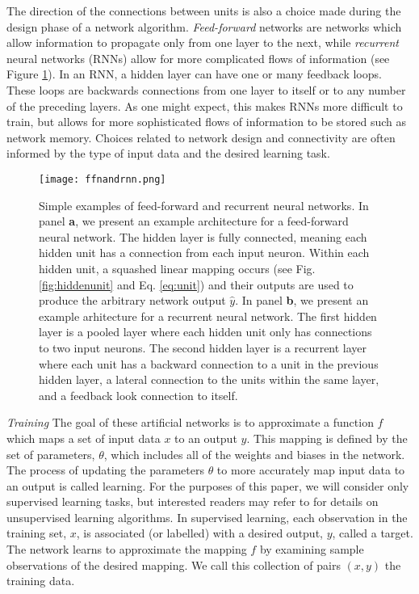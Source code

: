 \documentclass[12pt]{article}
\begin{document}
\indent The direction of the connections between units is also a choice made during the design phase of a network algorithm.
\textit{Feed-forward} networks are networks which allow information to propagate only from one layer to the next, while \textit{recurrent} neural networks (RNNs) allow for more complicated flows of information (see Figure \ref{fig:ffnandrnn}). In an RNN, a hidden layer can have one or many feedback loops. These loops are backwards connections from one layer to itself or to any number of the preceding layers. As one might expect, this makes RNNs more difficult to train, but allows for more sophisticated flows of information to be stored such as network memory. Choices related to network design and connectivity are often informed by the type of input data and the desired learning task.  \\
\begin{figure}
  \centering
  \texttt{[image: ffnandrnn.png]}
  \caption{Simple examples of feed-forward and recurrent neural networks. In panel \textbf{a}, we present an example architecture for a feed-forward neural network. The hidden layer is fully connected, meaning each hidden unit has a connection from each input neuron. Within each hidden unit, a squashed linear mapping occurs (see Fig. \ref{fig:hiddenunit} and Eq. \ref{eq:unit}) and their outputs are used to produce the arbitrary network output $\hat{y}$. In panel \textbf{b}, we present an example arhitecture for a recurrent neural network. The first hidden layer is a pooled layer where each hidden unit only has connections to two input neurons. The second hidden layer is a recurrent layer where each unit has a backward connection to a unit in the previous hidden layer, a lateral connection to the units within the same layer, and a feedback look connection to itself. }
  \label{fig:ffnandrnn}
\end{figure}
\indent \textit{Training} The goal of these artificial networks is to approximate a function $f$ which maps a set of input data $x$ to an output $y$. This mapping is defined by the set of parameters, $\theta$, which includes all of the weights and biases in the network. The process of updating the parameters $\theta$ to more accurately map input data to an output is called learning. For the purposes of this paper, we will consider only supervised learning tasks, but interested readers may refer to \cite{bengio} for details on unsupervised learning algorithms. In supervised learning, each observation in the training set, $x$, is associated (or labelled) with a desired output, $y$, called a target. The network learns to approximate the mapping $f$ by examining sample observations of the desired mapping. We call this collection of pairs $(x,y)$ the training data. \\
\end{document}
